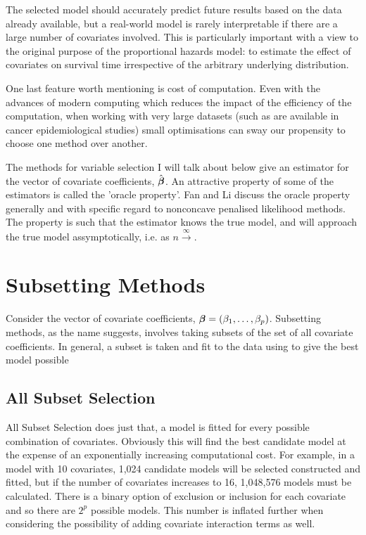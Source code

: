 The selected model should accurately predict future results based on the data already available, but a real-world model is rarely interpretable if there are a large number of covariates involved. This is particularly important with a view to the original purpose of the proportional hazards model: to estimate the effect of covariates on survival time irrespective of the arbitrary underlying distribution. 

One last feature worth mentioning is cost of computation. Even with the advances of modern computing which reduces the impact of the efficiency of the computation, when working with very large datasets (such as are available in cancer epidemiological studies) small optimisations can sway our propensity to choose one method over another.

The methods for variable selection I will talk about below give an estimator for the vector of covariate coefficients, $\hat{\boldsymbol{\beta}}$. An attractive property of some of the estimators is called the 'oracle property'. Fan and Li  discuss the oracle property generally and with specific regard to nonconcave penalised likelihood methods. The property is such that the estimator knows the true model, and will approach the true model assymptotically, i.e. as $n\xrightarrow \infty$.

\section{Subsetting Methods}

Consider the vector of covariate coefficients, $\boldsymbol{\beta}=(\beta_1, \ldots, \beta_p)$. Subsetting methods, as the name suggests, involves taking subsets of the set of all covariate coefficients. In general, a subset is taken and fit to the data using to give the best model possible


\subsection{All Subset Selection}

All Subset Selection does just that, a model is fitted for every possible combination of covariates. Obviously this will find the best candidate model at the expense of an exponentially increasing computational cost. For example, in a model with 10 covariates, 1,024 candidate models will be selected constructed and fitted, but if the number of covariates increases to 16, 1,048,576 models must be calculated. There is a binary option of exclusion or inclusion for each covariate and so there are $2^p$ possible models. This number is inflated further when considering the possibility of adding covariate interaction terms as well.


